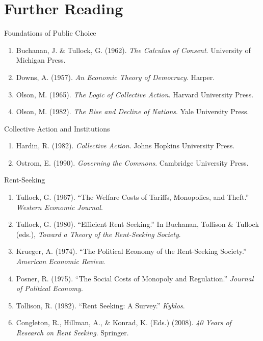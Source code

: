 \documentclass[10pt]{beamer}
\begin{document}
\section*{Further Reading}

\begin{frame}{Foundations of Public Choice}
\footnotesize
\begin{enumerate}
\item Buchanan, J. \& Tullock, G. (1962). \emph{The Calculus of Consent}. University of Michigan Press.
\item Downs, A. (1957). \emph{An Economic Theory of Democracy}. Harper.
\item Olson, M. (1965). \emph{The Logic of Collective Action}. Harvard University Press.
\item Olson, M. (1982). \emph{The Rise and Decline of Nations}. Yale University Press.
\end{enumerate}
\end{frame}


\begin{frame}{Collective Action and Institutions}
\footnotesize
\begin{enumerate}
\item Hardin, R. (1982). \emph{Collective Action}. Johns Hopkins University Press.
\item Ostrom, E. (1990). \emph{Governing the Commons}. Cambridge University Press.
\end{enumerate}
\end{frame}

\begin{frame}{Rent-Seeking}
\footnotesize
\begin{enumerate}
\item Tullock, G. (1967). “The Welfare Costs of Tariffs, Monopolies, and Theft.” \emph{Western Economic Journal}.
\item Tullock, G. (1980). “Efficient Rent Seeking.” In Buchanan, Tollison \& Tullock (eds.), \emph{Toward a Theory of the Rent-Seeking Society}.
\item Krueger, A. (1974). “The Political Economy of the Rent-Seeking Society.” \emph{American Economic Review}.
\item Posner, R. (1975). “The Social Costs of Monopoly and Regulation.” \emph{Journal of Political Economy}.
\item Tollison, R. (1982). “Rent Seeking: A Survey.” \emph{Kyklos}.
\item Congleton, R., Hillman, A., \& Konrad, K. (Eds.) (2008). \emph{40 Years of Research on Rent Seeking}. Springer.
\end{enumerate}
\end{frame}
\end{document}
